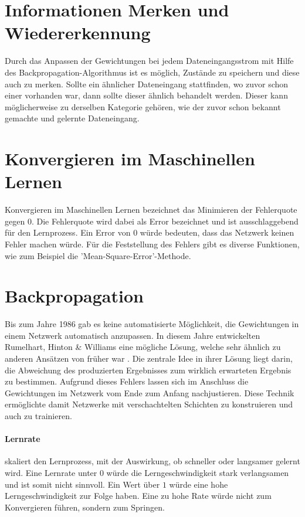 \section{Informationen Merken und Wiedererkennung}

Durch das Anpassen der Gewichtungen bei jedem Dateneingangsstrom mit Hilfe des Backpropagation-Algorithmus ist es möglich, Zustände zu speichern und diese auch zu merken. 
Sollte ein ähnlicher Dateneingang stattfinden, wo zuvor schon einer vorhanden war, dann sollte dieser ähnlich behandelt werden.
Dieser kann möglicherweise zu derselben Kategorie gehören, wie der zuvor schon bekannt gemachte und gelernte Dateneingang.

\section{Konvergieren im Maschinellen Lernen}
\label{sec:Konvergieren}

Konvergieren im Maschinellen Lernen bezeichnet das Minimieren der Fehlerquote gegen $0$.
Die Fehlerquote wird dabei als Error bezeichnet und ist ausschlaggebend für den Lernprozess.
Ein Error von $0$ würde bedeuten, dass das Netzwerk keinen Fehler machen würde.
Für die Feststellung des Fehlers gibt es diverse Funktionen, wie zum Beispiel die 'Mean-Square-Error'-Methode.

\section{Backpropagation}
\label{sec:Backpropagation}

Bis zum Jahre 1986 gab es keine automatisierte Möglichkeit, die Gewichtungen in einem Netzwerk automatisch anzupassen.
In diesem Jahre entwickelten Rumelhart, Hinton \& Williams eine mögliche Lösung, welche sehr ähnlich zu anderen Ansätzen von früher war \cite{hecht1988theory}.
Die zentrale Idee in ihrer Lösung liegt darin, die Abweichung des produzierten Ergebnisses zum wirklich erwarteten Ergebnis zu bestimmen. 
Aufgrund dieses Fehlers lassen sich im Anschluss die Gewichtungen im Netzwerk vom Ende zum Anfang nachjustieren. 
Diese Technik ermöglichte damit Netzwerke mit verschachtelten Schichten zu konstruieren und auch zu trainieren.

\paragraph{Lernrate} skaliert den Lernprozess, mit der Auswirkung, ob schneller oder langsamer gelernt wird.
Eine Lernrate unter $0$ würde die Lerngeschwindigkeit stark verlangsamen und ist somit nicht sinnvoll. 
Ein Wert über $1$ würde eine hohe Lerngeschwindigkeit zur Folge haben. 
Eine zu hohe Rate würde nicht zum Konvergieren führen, sondern zum Springen.

